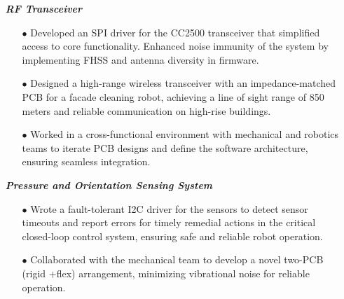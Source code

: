\documentclass[11pt]{article}
\begin{document}
\begin{itemize}[leftmargin=0.01in]\setlength\itemsep{-3pt}
  \item[]  \textbf{\emph{RF Transceiver}}
    \begin{itemize}\setlength{\itemsep}{0pt}\setlength{\parskip}{0pt}\vspace{-0.1em}
      \item[$\bullet$] Developed an SPI driver for the CC2500 transceiver that simplified access to core functionality. Enhanced noise immunity of the system by implementing FHSS and antenna diversity in firmware.
      \item[$\bullet$] Designed a high-range wireless transceiver with an impedance-matched PCB for a facade cleaning robot, achieving a line of sight range of 850 meters and reliable communication on high-rise buildings.
      \item[$\bullet$] Worked in a cross-functional environment with mechanical and robotics teams to iterate PCB designs and define the software architecture, ensuring seamless integration.
    \end{itemize}
  \item[]  \textbf{\emph{Pressure and Orientation Sensing System}}
    \begin{itemize}\setlength{\itemsep}{0pt}\setlength{\parskip}{0pt}\vspace{-0.1em}
      \item[$\bullet$] Wrote a fault-tolerant I2C driver for the sensors to detect sensor timeouts and report errors for timely remedial actions in the critical closed-loop control system, ensuring safe and reliable robot operation.
        \item[$\bullet$] Collaborated with the mechanical team to develop a novel two-PCB (rigid +flex) arrangement, minimizing vibrational noise for reliable operation.
   \end{itemize}





\end{itemize}
\end{document}
